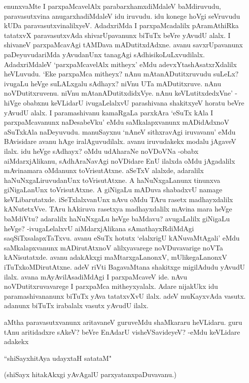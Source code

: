 enunxvaMte I parxpaMcavelAlx parabarxhamxdiMdaleV baMdiruvudu, paravasutxvina anugarxhadiMdaleV idu iruvudu. idu konege hoVgi seVruvudu kUDa paravasutxvinalilxyeV. AdadxriMda I parxpaMcadalilx pAramAthiRka tatatxvX paravasutxvAda shivarUpavanunx biTuTx beVre yAvudU alalx. I shivaneV parxpaMcavAgi tAMDava mADutitxdAdxne. avanu savxrUpavanunx paDeyuvudariMda yAvudanUnx tanagAgi sAdhisikoLuLxvudilalx. AdadxriMdaleV `parxpaMcavelAlx mitheyx' eMdu adevxYtashAsatxrXdalilx heVLuvudu. `Eke parxpaMca mitheyx? nAnu mAtanADutitxruvudu suLeLx? ivugaLu heVge suLALxgalu sAdhayx? niVnu UTa mADutitxruve. nAnu noVDutitxruvenu. niVnu mAtanADutitxdidxVye. nAnu keVLutitxdedxVne' -hiVge obabxnu keVLidarU ivugaLelalxvU parashivana shakitxyeV horatu beVre yAvudU alalx. I paramashivanu kamaRgaLa parxkAra `eSuTx kAla I parxpaMcavanunx naDesabeVku' eMdu saMkalapxvanunx mADidAdxnoV aSuTxkAla naDeyuvudu. manuSayxnu `nAneV sithxravAgi iruvavanu' eMdu BAvisidare avanu hAge iralAguvudilalx. avanu iruvudakekx modalu jAgaveV ilalx. idu heVge sAdhayx? oMdu udAharaNe noVDoVNa -obabx aiMdarxjAlikanu, sAdhAraNavAgi noVDidare EnU ilalxda oMdu jAgadalilx mAvinamara oMdanunx toVrisutAtxne. aSeTxV alalxde, adaralilx haNuNxgaLiruvudanUnx toVrisutAtxne. A haNuNxgaLanunx tinunxva giNigaLanUnx toVrisutAtxne. A giNigaLu mADuva shabadxvU namage keVLibarutatxde. iSeTxlalxvanUnx nAvu oMdu TAru rasetx madhayxdalilx kANutetxVve. TAru hAkiruva rasetxya madhayxdalilx mAvina mara heVge baMdiVtu? adaralilx haNuNxgaLu heVge baMdavu? avugaLalilx giNigaLu heVge? -ivugaLelalxvU aiMdarxjAlikana sAmathayxRdiMdAgi saqSiTxsalapxTaTxvu. avanu eSuTx hotutx `elalxrigU kANuvaMtAgali' eMdu saMkalapxvanunx mADirutAtxnoV alilxyavarege noVDuvavarige noVTa kANisutatxde. avanu adakAkxgi maMtarxgaLanonxV, mUlikegaLanonxV iTuTxkoMDirutAtxne. adeV riVti BagavaMtana shakitxge migilAdudu yAvudU ilalx. avana mAyAvilAsadiMdAgi I parxpaMcaveV ide. nAvu noVDutitxruvavarege I parxpaMca mitheyxyalalx. Adare nijakUkx idu paramashivananunx biTuTx yAva tatatxvXvU ilalx. adeV muKayxvAda vasutx. adanunx biTuTx irabalalx vasutx yAvudU ilalx. 

aMtha paravasutxvanunx aritavaneV guruveMdu shaMkararu heVLidaru. guru tAnu aritidadxre sAkeV? beVre EnAdarU visheVSavideyeV? -eMdu keVLidare adakekx 

\begin{shloka}
``shiSayxhitAya udayxtaH satataM"
\end{shloka}

(shiSayx hitakAkxgi yAvAgalU parxyatanxpaDuvavanu.)

